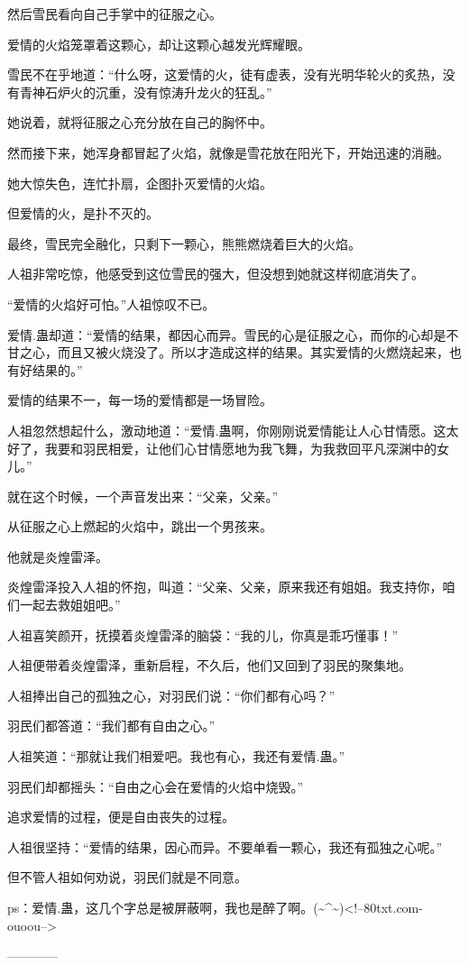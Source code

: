 \begin{this_body}
然后雪民看向自己手掌中的征服之心。

爱情的火焰笼罩着这颗心，却让这颗心越发光辉耀眼。

雪民不在乎地道：“什么呀，这爱情的火，徒有虚表，没有光明华轮火的炙热，没有青神石炉火的沉重，没有惊涛升龙火的狂乱。”

她说着，就将征服之心充分放在自己的胸怀中。

然而接下来，她浑身都冒起了火焰，就像是雪花放在阳光下，开始迅速的消融。

她大惊失色，连忙扑扇，企图扑灭爱情的火焰。

但爱情的火，是扑不灭的。

最终，雪民完全融化，只剩下一颗心，熊熊燃烧着巨大的火焰。

人祖非常吃惊，他感受到这位雪民的强大，但没想到她就这样彻底消失了。

“爱情的火焰好可怕。”人祖惊叹不已。

爱情.蛊却道：“爱情的结果，都因心而异。雪民的心是征服之心，而你的心却是不甘之心，而且又被火烧没了。所以才造成这样的结果。其实爱情的火燃烧起来，也有好结果的。”

爱情的结果不一，每一场的爱情都是一场冒险。

人祖忽然想起什么，激动地道：“爱情.蛊啊，你刚刚说爱情能让人心甘情愿。这太好了，我要和羽民相爱，让他们心甘情愿地为我飞舞，为我救回平凡深渊中的女儿。”

就在这个时候，一个声音发出来：“父亲，父亲。”

从征服之心上燃起的火焰中，跳出一个男孩来。

他就是炎煌雷泽。

炎煌雷泽投入人祖的怀抱，叫道：“父亲、父亲，原来我还有姐姐。我支持你，咱们一起去救姐姐吧。”

人祖喜笑颜开，抚摸着炎煌雷泽的脑袋：“我的儿，你真是乖巧懂事！”

人祖便带着炎煌雷泽，重新启程，不久后，他们又回到了羽民的聚集地。

人祖捧出自己的孤独之心，对羽民们说：“你们都有心吗？”

羽民们都答道：“我们都有自由之心。”

人祖笑道：“那就让我们相爱吧。我也有心，我还有爱情.蛊。”

羽民们却都摇头：“自由之心会在爱情的火焰中烧毁。”

追求爱情的过程，便是自由丧失的过程。

人祖很坚持：“爱情的结果，因心而异。不要单看一颗心，我还有孤独之心呢。”

但不管人祖如何劝说，羽民们就是不同意。

ps：爱情.蛊，这几个字总是被屏蔽啊，我也是醉了啊。(\~{}\^{}\~{})<!--80txt.com-ouoou-->

------------

\end{this_body}

